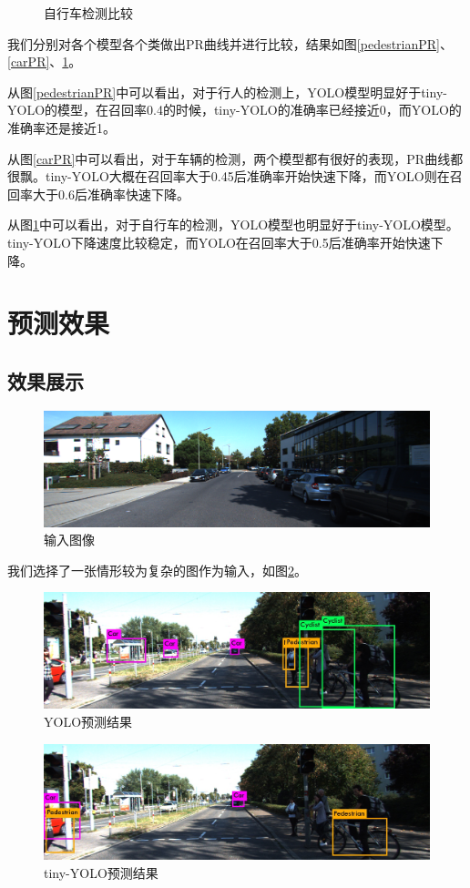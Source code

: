 {\begin{figure}[htbp]
	\caption{自行车检测比较}
	\label{cyclistPR}
	\end{figure}
	我们分别对各个模型各个类做出PR曲线并进行比较，结果如图\ref{pedestrianPR}、\ref{carPR}、\ref{cyclistPR}。

	从图\ref{pedestrianPR}中可以看出，对于行人的检测上，YOLO模型明显好于tiny-YOLO的模型，在召回率0.4的时候，tiny-YOLO的准确率已经接近0，而YOLO的准确率还是接近1。

	从图\ref{carPR}中可以看出，对于车辆的检测，两个模型都有很好的表现，PR曲线都很飘。tiny-YOLO大概在召回率大于0.45后准确率开始快速下降，而YOLO则在召回率大于0.6后准确率快速下降。

	从图\ref{cyclistPR}中可以看出，对于自行车的检测，YOLO模型也明显好于tiny-YOLO模型。tiny-YOLO下降速度比较稳定，而YOLO在召回率大于0.5后准确率开始快速下降。
}

\section{预测效果}{
	\subsection{效果展示}
	\begin{figure}[htbp]
	\centering
	\includegraphics[width=5in]{images/007435.png}
	\caption{输入图像}
	\label{007435}
	\end{figure}
	我们选择了一张情形较为复杂的图作为输入，如图\ref{007435}。

	\begin{figure}[htbp]
	\centering
	\includegraphics[width=5in]{images/predictYOLO.jpg}
	\caption{YOLO预测结果}
	\label{predictYOLO}
	\end{figure}
	\begin{figure}[htbp]
	\centering
	\includegraphics[width=5in]{images/predictTiny-YOLO.jpg}
	\caption{tiny-YOLO预测结果}
	\label{predictTiny-YOLO}
	\end{figure}

}

